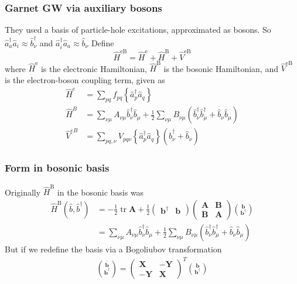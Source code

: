 \documentclass{beamer}
\begin{document}
\begin{frame}
    \frametitle{Garnet GW via auxiliary bosons}
They used a basis of particle-hole excitations, approximated as bosons. So $\hat{a}_a^\dagger \hat{a}_i \approx \hat{b}_\nu^\dag$ and $\hat{a}_i^\dagger \hat{a}_a \approx \hat{b}_\nu$
Define \begin{equation}
\hat{H}^{\mathrm{eB}}=\hat{H}^{\mathrm{e}}+\hat{H}^{\mathrm{B}}+\hat{V}^{\mathrm{eB}}
\end{equation}
where $\hat{H}^{\mathrm{e}}$ is the electronic Hamiltonian, $\hat{H}^{\mathrm{B}}$ is the bosonic Hamiltonian, and $\hat{V}^{\mathrm{eB}}$ is the electron-boson coupling term, given as
\begin{align}
\hat{H}^e&=\sum_{p q} f_{p q}\left\{\hat{a}_p^{\dagger} \hat{a}_q\right\} \\
\hat{H}^{B}&=\sum_{\nu \mu} A_{\nu \mu} \hat{b}_\nu^{\dagger} \hat{b}_\mu+\frac{1}{2} \sum_{\nu \mu} B_{\nu \mu}\left(\hat{b}_\nu^{\dagger} \hat{b}_\mu^{\dagger}+\hat{b}_\nu \hat{b}_\mu\right)
\label{b} \\
\hat{V}^{eB}&=\sum_{p q, \nu} V_{p q \nu}\left\{\hat{a}_p^{\dagger} \hat{a}_q\right\}\left(\hat{b}_\nu^{\dagger}+\hat{b}_\nu\right)
\label{eb}
\end{align}
\end{frame}

\begin{frame}
    \frametitle{Form in bosonic basis}
Originally $\hat{H}^{\mathrm{B}}$ in the bosonic basis was
\begin{align}
\hat{H}^{\mathrm{B}}\left(\hat{b}, \hat{b}^{\dagger}\right)&=-\frac{1}{2} \operatorname{tr} \mathbf{A}+\frac{1}{2}\left(\begin{array}{ll}
\mathbf{b}^{\dagger} & \mathbf{b}
\end{array}\right)\left(\begin{array}{ll}
\mathbf{A} & \mathbf{B} \\
\mathbf{B} & \mathbf{A}
\end{array}\right)\binom{\mathbf{b}}{\mathbf{b}^{\dagger}}
\label{eq:rpa_rec}
 \\
&=\sum_{\nu \mu} A_{\nu \mu} \hat{b}_\nu^{\dagger} \hat{b}_\mu+\frac{1}{2} \sum_{\nu \mu} B_{\nu \mu}\left(\hat{b}_\nu^{\dagger} \hat{b}_\mu^{\dagger}+\hat{b}_\nu \hat{b}_\mu\right)
\end{align}
But if we redefine the basis via a Bogoliubov transformation
\begin{align}
\binom{\overline{\mathbf{b}}}{\overline{\mathbf{b}}^{\dagger}}=\left(\begin{array}{cc}
\mathbf{X} & -\mathbf{Y} \\
-\mathbf{Y} & \mathbf{X}
\end{array}\right)^T\binom{\mathbf{b}}{\mathbf{b}^{\dagger}}
\end{align}

\end{frame}
\end{document}
